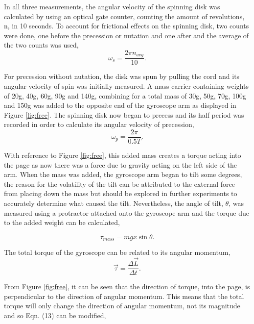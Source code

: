 \documentclass{article}
\begin{document}
In all three measurements, the angular velocity of the spinning disk was calculated by
using an optical gate counter, counting the amount of revolutions, n, in 10 seconds.
To account for frictional effects on the spinning disk, two counts were done, one before
the precession or nutation and one after and the average of the two counts was used,
\begin{equation}
    \omega_s = \frac{2\pi n_{avg}}{10}.
\end{equation}

For precession without nutation, the disk was spun by pulling the cord and its angular
velocity of spin was initially measured. A mass carrier containing weights of 20g, 40g,
60g, 90g and 140g, combining for a total mass of 30g, 50g, 70g, 100g and 150g was added
to the opposite end of the gyroscope arm as displayed in Figure \ref{fig:free}. The spinning
disk now began to precess and its half period was recorded in order to calculate its angular
velocity of precession,
\begin{equation}
    \omega_p = \frac{2\pi}{0.5T}.
\end{equation}

With 
reference to Figure \ref{fig:free}, this added mass creates a torque acting into the page
as now there was a force due to gravity acting on the left side of the arm. When the mass
was added, the gyroscope arm began to tilt some degrees, the reason for the volatility of
the tilt can be attributed to the external force from placing down the mass but should be 
explored in further experiments to accurately determine what caused the tilt. Nevertheless,
the angle of tilt, $\theta$, was measured using a protractor attached onto the 
gyroscope arm and the torque due to the added weight can be calculated,

\begin{equation}
    \tau_{mass} = mgx\sin{\theta}.
\end{equation}

The total torque of the gyroscope can be related to its angular momentum,
\begin{equation}
    \vec{\tau} = \frac{\Delta \vec{L}}{\Delta t}.
\end{equation}

From Figure \ref{fig:free}, it can be seen that the direction of torque, into the page, is
perpendicular to the direction of angular momentum. This means that the total torque will 
only change the direction of angular momentum, not its magnitude and so Eqn. (13) can be 
modified,
\end{document}
